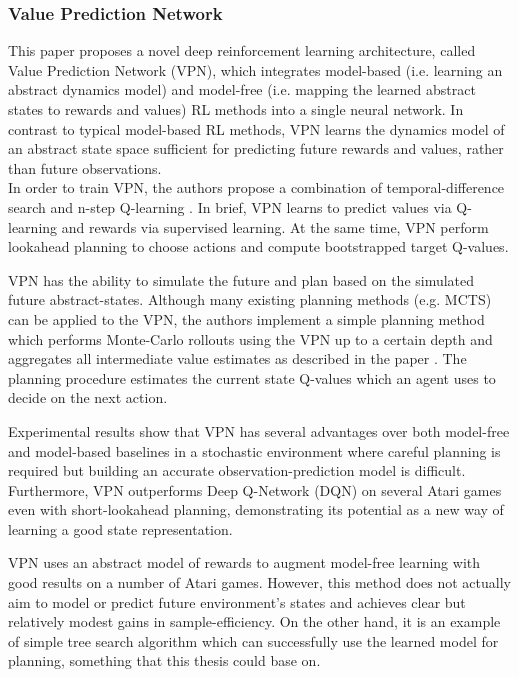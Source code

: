 \subsubsection{Value Prediction Network}

This paper \cite{Algo.VPN} proposes a novel deep reinforcement learning architecture, called Value Prediction Network (VPN), which integrates model-based (i.e. learning an abstract dynamics model) and model-free (i.e. mapping the learned abstract states to rewards and values) RL methods into a single neural network. In contrast to typical model-based RL methods, VPN learns the dynamics model of an abstract state space sufficient for predicting future rewards and values, rather than future observations. \\
In order to train VPN, the authors propose a combination of temporal-difference search \cite{Algo.TDSearch} and n-step Q-learning \cite{Algo.A3C}. In brief, VPN learns to predict values via Q-learning and rewards via supervised learning. At the same time, VPN perform lookahead planning to choose actions and compute bootstrapped target Q-values.

VPN has the ability to simulate the future and plan based on the simulated future abstract-states. Although many existing planning methods (e.g. MCTS) can be applied to the VPN, the authors implement a simple planning method which performs Monte-Carlo rollouts using the VPN up to a certain depth and aggregates all intermediate value estimates as described in the paper \cite{Algo.VPN}. The planning procedure estimates the current state Q-values which an agent uses to decide on the next action.

Experimental results show that VPN has several advantages over both model-free and model-based baselines in a stochastic environment where careful planning is required but building an accurate observation-prediction model is difficult. Furthermore, VPN outperforms Deep Q-Network (DQN) on several Atari games even with short-lookahead planning, demonstrating its potential as a new way of learning a good state representation.

VPN uses an abstract model of rewards to augment model-free learning with good results on a number of Atari games. However, this method does not actually aim to model or predict future environment's states and achieves clear but relatively modest gains in sample-efficiency. On the other hand, it is an example of simple tree search algorithm which can successfully use the learned model for planning, something that this thesis could base on.
